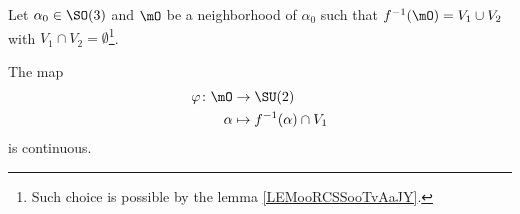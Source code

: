 \begin{proposition}        \label{PROPooHCVZooMOSzTm}
    Let \( \alpha_0\in \SO(3)\) and \( \mO\) be a neighborhood of \( \alpha_0\) such that \( f^{-1}(\mO)=V_1\cup V_2\) with \( V_1\cap V_2=\emptyset\)\footnote{Such choice is possible by the lemma \ref{LEMooRCSSooTvAaJY}.}.

    The map
    \begin{equation}
        \begin{aligned}
            \varphi\colon \mO&\to\SU(2) \\
            \alpha&\mapsto f^{-1}(\alpha)\cap V_1 
        \end{aligned}
    \end{equation}
    is continuous.
\end{proposition}

